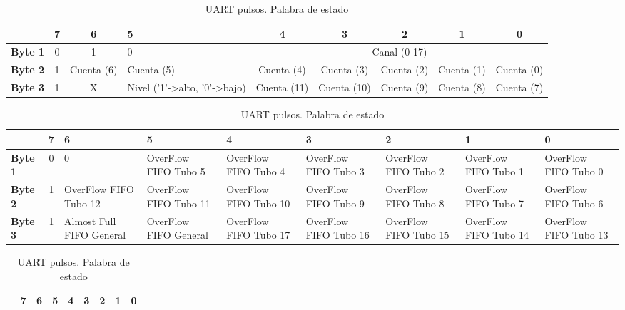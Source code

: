 		\begin{table}[h]
			\tiny
			\begin{tabularx}{\textwidth}{|l|c|c|X|c|c|c|c|c|}
				\hline
				\rowcolor[HTML]{C0C0C0} 
				\multicolumn{1}{|r|}{\textbf{Bit}}    	& 7 & 6          & 5 				& 4 	       & 3 	     & 2 	  & 1          & 0 	     \\ \hline
				\cellcolor[HTML]{C0C0C0}\textbf{Byte 1} & 0 & 1          & 0  				& \multicolumn{5}{c|}{Canal (0-17)}				     \\ \hline
				\cellcolor[HTML]{C0C0C0}\textbf{Byte 2} & 1 & Cuenta (6) & Cuenta (5)      		& Cuenta (4)   & Cuenta (3)  & Cuenta (2) & Cuenta (1) & Cuenta (0)  \\ \hline
				\cellcolor[HTML]{C0C0C0}\textbf{Byte 3} & 1 & X          & Nivel ('1'->alto, '0'->bajo) & Cuenta (11)  & Cuenta (10) & Cuenta (9) & Cuenta (8) & Cuenta (7)  \\ \hline
			\end{tabularx}
			\caption{UART pulsos. Palabra de ancho de pulso}
			\label{tab:FPGAUartPulso}
			\begin{tabularx}{\textwidth}{|l|c|X|X|X|X|X|X|X|}
				\hline
				\rowcolor[HTML]{C0C0C0} 
				\multicolumn{1}{|r|}{\textbf{Bit}} 	& 7 & 6 		       & 5 		       & 4		       & 3 		       & 2		       & 1          	       & 0			\\ \hline
				\cellcolor[HTML]{C0C0C0}\textbf{Byte 1} & 0 & 0                        & OverFlow FIFO Tubo 5  & OverFlow FIFO Tubo 4  & OverFlow FIFO Tubo 3  & OverFlow FIFO Tubo 2  & OverFlow FIFO Tubo 1  & OverFlow FIFO Tubo 0	\\ \hline
				\cellcolor[HTML]{C0C0C0}\textbf{Byte 2} & 1 & OverFlow FIFO Tubo 12    & OverFlow FIFO Tubo 11 & OverFlow FIFO Tubo 10 & OverFlow FIFO Tubo 9  & OverFlow FIFO Tubo 8  & OverFlow FIFO Tubo 7  & OverFlow FIFO Tubo 6	\\ \hline
				\cellcolor[HTML]{C0C0C0}\textbf{Byte 3} & 1 & Almost Full FIFO General & OverFlow FIFO General & OverFlow FIFO Tubo 17 & OverFlow FIFO Tubo 16 & OverFlow FIFO Tubo 15 & OverFlow FIFO Tubo 14 & OverFlow FIFO Tubo 13	\\ \hline
			\end{tabularx}
			\caption{UART pulsos. Palabra de estado}
			\label{tab:FPGAUartOver}
			\begin{tabularx}{\textwidth}{|l|X|c|c|c|c|c|c|c|}
				\hline
				\rowcolor[HTML]{C0C0C0} 
				\multicolumn{1}{|r|}{\textbf{Bit}}    	& 7 & 6           & 5 		& 4 	      & 3 	    & 2 	 & 1           & 0 	     	\\ \hline

\end{tabularx}
\end{table}
